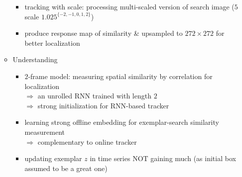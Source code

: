 \begin{itemize}
\begin{itemize}
\begin{itemize}
		\item tracking with scale: processing multi-scaled version of search image ($5$ scale $1.025^{\{-2,-1,0,1,2\}}$)
		\item produce response map of similarity \& upsampled to $272\times272$ for better localization
		\end{itemize}
	\item Understanding
		\begin{itemize}
		\item $2$-frame model: measuring spatial similarity by correlation for localization \\
		$\Rightarrow$ an unrolled RNN trained with length $2$ \\ 
		$\Rightarrow$ strong initialization for RNN-based tracker
		\item learning strong offline embedding for exemplar-search similarity measurement \\
		$\Rightarrow$ complementary to online tracker
		\item updating exemplar $z$ in time series NOT gaining much (as initial box assumed to be a great one)
		\end{itemize}
	\end{itemize}


\end{itemize}
